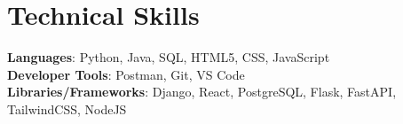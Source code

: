 \documentclass[letterpaper,11pt]{article}
\begin{document}
\section{Technical Skills}
 \begin{itemize}[leftmargin=0.15in, label={}]
    \small{\item{   
     \textbf{Languages}{: Python, Java, SQL, HTML5, CSS, JavaScript} \\[1mm]
     \textbf{Developer Tools}{: Postman, Git, VS Code} \\[1mm]
     \textbf{Libraries/Frameworks}{: Django, React, PostgreSQL, Flask, FastAPI, TailwindCSS, NodeJS} \\ [1mm]
    }}
 \end{itemize}
 \vspace{-16pt}
 \vspace{3pt}
\vspace{10pt}

\vspace{-15pt}
\end{document}
